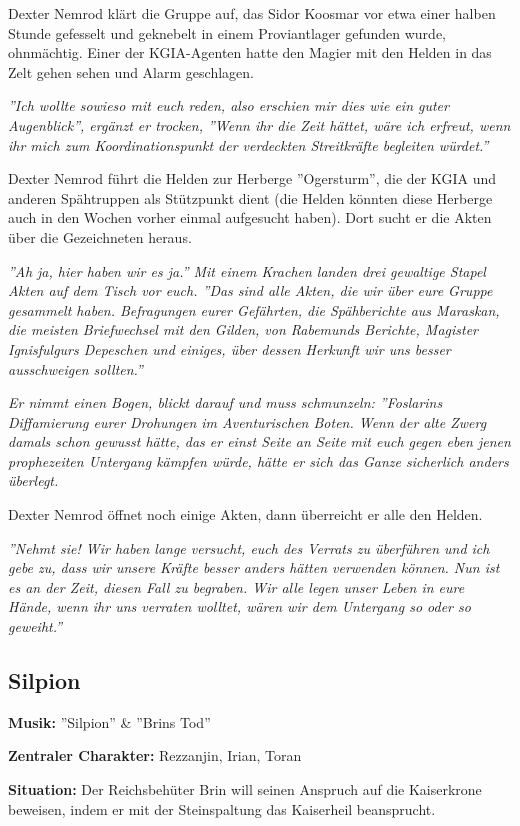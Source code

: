 Dexter Nemrod klärt die Gruppe auf, das Sidor Koosmar vor etwa einer halben Stunde gefesselt und geknebelt in einem Proviantlager gefunden wurde, ohnmächtig. Einer der KGIA-Agenten hatte den Magier mit den Helden in das Zelt gehen sehen und Alarm geschlagen.

\emph{''Ich wollte sowieso mit euch reden, also erschien mir dies wie ein guter Augenblick'', ergänzt er trocken, ''Wenn ihr die Zeit hättet, wäre ich erfreut, wenn ihr mich zum Koordinationspunkt der verdeckten Streitkräfte begleiten würdet.''}

Dexter Nemrod führt die Helden zur Herberge ''Ogersturm'', die der KGIA und anderen Spähtruppen als Stützpunkt dient (die Helden könnten diese Herberge auch in den Wochen vorher einmal aufgesucht haben). Dort sucht er die Akten über die Gezeichneten heraus.

\emph{''Ah ja, hier haben wir es ja.'' Mit einem Krachen landen drei gewaltige Stapel Akten auf dem Tisch vor euch. ''Das sind alle Akten, die wir über eure Gruppe gesammelt haben. Befragungen eurer Gefährten, die Spähberichte aus Maraskan, die meisten Briefwechsel mit den Gilden, von Rabemunds Berichte, Magister Ignisfulgurs Depeschen und einiges, über dessen Herkunft wir uns besser ausschweigen sollten.''}

\emph{Er nimmt einen Bogen, blickt darauf und muss schmunzeln: ''Foslarins Diffamierung eurer Drohungen im Aventurischen Boten. Wenn der alte Zwerg damals schon gewusst hätte, das er einst Seite an Seite mit euch gegen eben jenen prophezeiten Untergang kämpfen würde, hätte er sich das Ganze sicherlich anders überlegt.}

Dexter Nemrod öffnet noch einige Akten, dann überreicht er alle den Helden.

\emph{''Nehmt sie! Wir haben lange versucht, euch des Verrats zu überführen und ich gebe zu, dass wir unsere Kräfte besser anders hätten verwenden können. Nun ist es an der Zeit, diesen Fall zu begraben. Wir alle legen unser Leben in eure Hände, wenn ihr uns verraten wolltet, wären wir dem Untergang so oder so geweiht.''}

\subsection{Silpion}
\textbf{Musik:} ''Silpion'' \& ''Brins Tod''

\textbf{Zentraler Charakter:} Rezzanjin, Irian, Toran 

\textbf{Situation:} Der Reichsbehüter Brin will seinen Anspruch auf die Kaiserkrone beweisen, indem er mit der Steinspaltung das Kaiserheil beansprucht.

